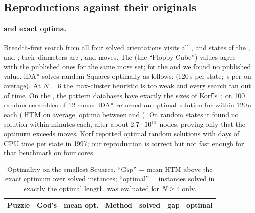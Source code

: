 \subsection{Reproductions against their originals}
\label{sec:exp-repro}

\paragraph{\Mone and exact optima.}
Breadth-first search from all four solved orientations visits all \StatesSquareThree{}, \StatesSquareFour{} and
\StatesSquareFive{} states of the ,  and ; their diameters are \GodSquareThree{}, \GodSquareFour{} and
\GodSquareFive{} moves. The  (the ``Floppy Cube'') values agree with the published ones for the same move set; for the
 and  we found no published value. IDA* solves random Squares optimally as follows: \MoneSquareCoverage{} (120\,s per
state; \MoneSquareFiveTime\,s per  on average). At $N=6$ the max-cluster heuristic is too weak and every search ran out of
time. On the , the pattern databases have exactly the sizes of Korf's~\cite{korf1997optimal}; on 100 random scrambles of
12 moves IDA* returned an optimal solution for \MoneDTwelveSolved{} within 120\,s each (\MoneDTwelveHTM{} HTM on average, optima
between \MoneDTwelveMin{} and \MoneDTwelveMax{}). On \MoneRandTried{} random states it found no solution within \MoneRandMin{}
minutes each, after about $2.7\cdot10^{10}$ nodes, proving only that the optimum exceeds \MoneRandBound{} moves. Korf
reported optimal random  solutions with days of CPU time per state in 1997; our reproduction is correct but not fast enough
for that benchmark on four cores.

\begin{table}[t]
\caption{Optimality on the smallest Squares. ``Gap'' = mean HTM above the exact optimum over solved instances; ``optimal'' =
instances solved in exactly the optimal length. \FiveA was evaluated for $N\ge4$ only.}
\label{tab:optimal}
\small\setlength{\tabcolsep}{4pt}
\begin{tabular}{@{}lrr>{\raggedright\arraybackslash}p{2.2cm}rrr@{}}
\toprule
Puzzle & God's & mean opt. & Method & solved & gap & optimal \\
\midrule

\end{tabular}
\end{table}


